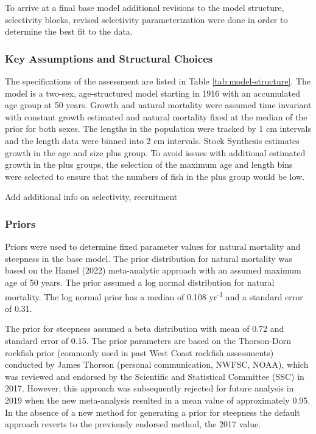 \documentclass[11pt,
  english,
  letterpaper,
]{article}
\begin{document}
To arrive at a final base model additional revisions to the model structure, selectivity blocks, revised selectivity parameterization were done in order to determine the best fit to the data.

\hypertarget{key-assumptions-and-structural-choices}{%
\subsubsection{Key Assumptions and Structural Choices}\label{key-assumptions-and-structural-choices}}

The specifications of the assessment are listed in Table \ref{tab:model-structure}. The model is a two-sex, age-structured model starting in 1916 with an accumulated age group at 50 years. Growth and natural mortality were assumed time invariant with constant growth estimated and natural mortality fixed at the median of the prior for both sexes. The lengths in the population were tracked by 1 cm intervals and the length data were binned into 2 cm intervals. Stock Synthesis estimates growth in the age and size plus group. To avoid issues with additional estimated growth in the plus groups, the selection of the maximum age and length bins were selected to ensure that the numbers of fish in the plus group would be low.

Add additional info on selectivity, recruitment

\hypertarget{priors}{%
\subsubsection{Priors}\label{priors}}

Priors were used to determine fixed parameter values for natural mortality and steepness in the base model. The prior distribution for natural mortality was based on the Hamel (2022) meta-analytic approach with an assumed maximum age of 50 years. The prior assumed a log normal distribution for natural mortality. The log normal prior has a median of 0.108 yr\textsuperscript{-1} and a standard error of 0.31.

The prior for steepness assumed a beta distribution with mean of 0.72 and standard error of 0.15. The prior parameters are based on the Thorson-Dorn rockfish prior (commonly used in past West Coast rockfish assessments) conducted by James Thorson (personal communication, NWFSC, NOAA), which was reviewed and endorsed by the Scientific and Statistical Committee (SSC) in 2017. However, this approach was subsequently rejected for future analysis in 2019 when the new meta-analysis resulted in a mean value of approximately 0.95. In the absence of a new method for generating a prior for steepness the default approach reverts to the previously endorsed method, the 2017 value.
\end{document}
